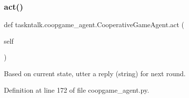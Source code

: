 \subsubsection{\texorpdfstring{act()}{act()}}
{\footnotesize\ttfamily def taskntalk.\+coopgame\+\_\+agent.\+Cooperative\+Game\+Agent.\+act (\begin{DoxyParamCaption}\item[{}]{self }\end{DoxyParamCaption})}

\begin{DoxyVerb}Based on current state, utter a reply (string) for next round.\end{DoxyVerb}
 

Definition at line 172 of file coopgame\+\_\+agent.\+py.



